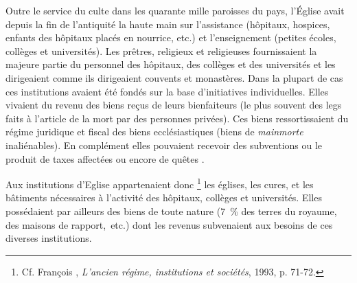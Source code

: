  Outre le service du culte dans les quarante mille paroisses du pays, l'Église avait  depuis la fin de l'antiquité la haute main sur l'assistance (hôpitaux, hospices, enfants des hôpitaux placés en nourrice, etc.) et l'enseignement (petites écoles, collèges et universités). Les prêtres, religieux et religieuses fournissaient la majeure partie du personnel des hôpitaux, des collèges et des universités et les dirigeaient comme ils dirigeaient couvents et monastères. Dans la plupart de cas ces institutions avaient été fondés sur la base d'initiatives individuelles. Elles vivaient du revenu des biens reçus de leurs bienfaiteurs (le plus souvent des legs faits à l'article de la mort par des personnes privées). Ces biens ressortissaient du régime juridique et fiscal des biens ecclésiastiques (biens de \emph{mainmorte} inaliénables). En complément elles pouvaient recevoir des subventions ou le produit de taxes affectées ou encore de quêtes . 
 
 Aux institutions d'Eglise appartenaient donc%
\footnote{Cf. François , \emph{L'ancien régime, institutions et sociétés}, 1993, p. 71-72.} 
les églises, les cures, et les bâtiments nécessaires à l'activité des hôpitaux, collèges et universités. Elles possédaient par ailleurs des biens de toute nature (7~\% des terres du royaume, des maisons de rapport,~etc.) dont les revenus subvenaient aux besoins de ces diverses institutions. 

